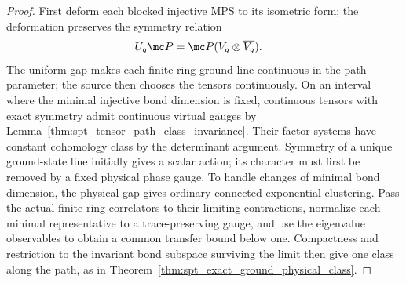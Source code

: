 \begin{proof}
    First deform each blocked injective MPS to its isometric form; the
    deformation preserves the symmetry relation
    \begin{align}
        U_g\mc P & =\mc P(V_g\otimes\overline{V_g}).
        \notag
    \end{align}
    The uniform gap makes each finite-ring ground line continuous in the
    path parameter; the source then chooses the tensors continuously.
    On an interval where the minimal injective bond dimension is fixed,
    continuous tensors with exact symmetry admit continuous virtual gauges
    by Lemma~\ref{thm:spt_tensor_path_class_invariance}. Their factor
    systems have constant cohomology class by the determinant argument.
    Symmetry of a unique ground-state line initially gives a scalar action;
    its character must first be removed by a fixed physical phase gauge.
    To handle changes of minimal bond dimension, the physical gap gives
    ordinary connected exponential clustering. Pass the actual finite-ring
    correlators to their limiting contractions, normalize each minimal
    representative to a trace-preserving gauge, and use the eigenvalue
    observables to obtain a common transfer bound below one. Compactness
    and restriction to the invariant bond subspace surviving the limit then
    give one class along the path, as in
    Theorem~\ref{thm:spt_exact_ground_physical_class}.


\end{proof}
